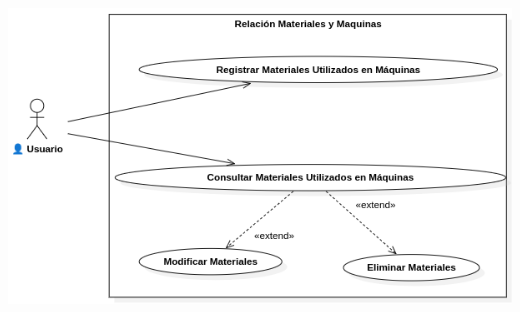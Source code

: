 \documentclass{article}
\begin{document}
\begin{center}
		\includegraphics[width=1\linewidth]{imagenes/cu_relacion_materiales_maquinas.png}
	\end{center}
\end{document}
